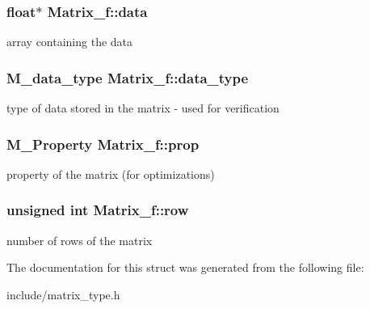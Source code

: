 \subsubsection[{\texorpdfstring{data}{data}}]{\setlength{\rightskip}{0pt plus 5cm}float$\ast$ Matrix\+\_\+f\+::data}\hypertarget{structMatrix__f_aad17369cd1b7acebc55379d862e821c2}{}\label{structMatrix__f_aad17369cd1b7acebc55379d862e821c2}
array containing the data 
\subsubsection[{\texorpdfstring{data\+\_\+type}{data_type}}]{\setlength{\rightskip}{0pt plus 5cm}M\+\_\+data\+\_\+type Matrix\+\_\+f\+::data\+\_\+type}\hypertarget{structMatrix__f_a208178d3dfeaa5adab42b96aff8c97d5}{}\label{structMatrix__f_a208178d3dfeaa5adab42b96aff8c97d5}
type of data stored in the matrix -\/ used for verification 
\subsubsection[{\texorpdfstring{prop}{prop}}]{\setlength{\rightskip}{0pt plus 5cm}M\+\_\+\+Property Matrix\+\_\+f\+::prop}\hypertarget{structMatrix__f_a0f8b87b8012ab2ffa92fbe55b1009d71}{}\label{structMatrix__f_a0f8b87b8012ab2ffa92fbe55b1009d71}
property of the matrix (for optimizations) 
\subsubsection[{\texorpdfstring{row}{row}}]{\setlength{\rightskip}{0pt plus 5cm}unsigned int Matrix\+\_\+f\+::row}\hypertarget{structMatrix__f_a1105833a934acf7f2a07b154c1733acf}{}\label{structMatrix__f_a1105833a934acf7f2a07b154c1733acf}
number of rows of the matrix 

The documentation for this struct was generated from the following file\+:\begin{DoxyCompactItemize}
\item 
include/matrix\+\_\+type.\+h\end{DoxyCompactItemize}
